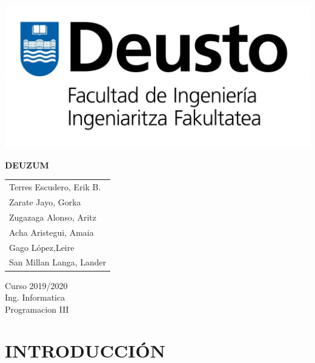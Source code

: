 \documentclass{article}
\theoremstyle{definition}
\begin{document}
\begin{titlepage}
	\begin{center}
	    \includegraphics[scale = 0.5]{LogoIngenieriaR.jpg}\\[1.0 cm]
	\end{center}
	
    \vspace*{150pt}
    \centering
    {\Huge
     \textbf{DEUZUM}
    }
    
	\vspace*{200pt}
	
	
	\begin{minipage}{2in}
		\begin{tabular}{l}
			Terres Escudero, Erik B.    \\
			Zarate Jayo, Gorka   \\
			Zugazaga Alonso, Aritz  \\
			Acha Aristegui, Amaia  \\
			Gago López,Leire  \\
			San Millan Langa, Lander 
		\end{tabular}
	\end{minipage}
	\hfill
	\begin{minipage}{3in}
	\begin{flushright}
	\Large Curso 2019/2020 \\
		\Huge Ing. Informatica\\
		\LARGE Programacion III
	\end{flushright}
		
	\end{minipage}
    
	
\end{titlepage}


\section{INTRODUCCIÓN}
\end{document}
